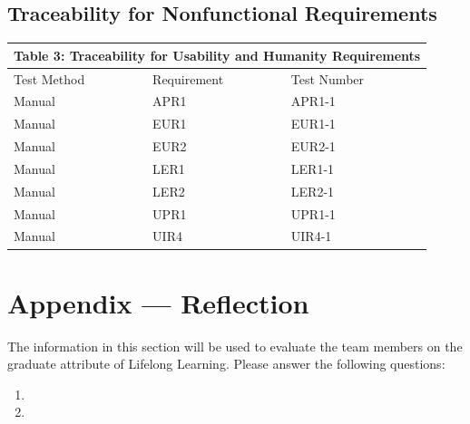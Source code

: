 \documentclass[12pt, titlepage]{article}
\begin{document}
\subsection{Traceability for Nonfunctional Requirements}

\begin{tabular}{|p{}|p{}|p{}|}

\hline \multicolumn{3}{|c|}{Table 3: Traceability for Usability and Humanity Requirements}\\

\hline Test Method&Requirement&Test Number\\

\hline Manual&APR1&APR1-1\\

\hline Manual&EUR1&EUR1-1\\

\hline Manual&EUR2&EUR2-1\\

\hline Manual&LER1&LER1-1\\

\hline Manual&LER2&LER2-1\\

\hline Manual&UPR1&UPR1-1\\

\hline Manual&UIR4&UIR4-1\\

\hline

\end{tabular}




\newpage{}
\section*{Appendix --- Reflection}

The information in this section will be used to evaluate the team members on the
graduate attribute of Lifelong Learning.  Please answer the following questions:

\begin{enumerate}
  \item 
  \item 
\end{enumerate}
\end{document}

